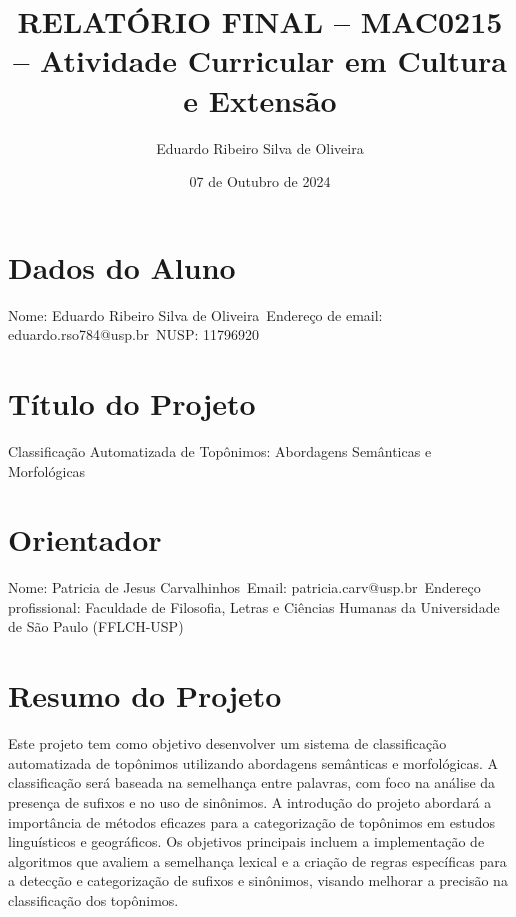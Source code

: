 \documentclass{article}
\title{RELATÓRIO FINAL – MAC0215 – Atividade Curricular em Cultura e Extensão}
\author{Eduardo Ribeiro Silva de Oliveira}
\date{07 de Outubro de 2024}
\begin{document}
\maketitle

\section*{Dados do Aluno}
Nome: Eduardo Ribeiro Silva de Oliveira\
Endereço de email: eduardo.rso784@usp.br\
NUSP: 11796920

\section*{Título do Projeto}
Classificação Automatizada de Topônimos: Abordagens Semânticas e Morfológicas

\section*{Orientador}
Nome: Patricia de Jesus Carvalhinhos\
Email: patricia.carv@usp.br\
Endereço profissional: Faculdade de Filosofia, Letras e Ciências Humanas da Universidade de São Paulo (FFLCH-USP)

\section*{Resumo do Projeto}
Este projeto tem como objetivo desenvolver um sistema de classificação automatizada de topônimos utilizando abordagens semânticas e morfológicas. A classificação será baseada na semelhança entre palavras, com foco na análise da presença de sufixos e no uso de sinônimos. A introdução do projeto abordará a importância de métodos eficazes para a categorização de topônimos em estudos linguísticos e geográficos. Os objetivos principais incluem a implementação de algoritmos que avaliem a semelhança lexical e a criação de regras específicas para a detecção e categorização de sufixos e sinônimos, visando melhorar a precisão na classificação dos topônimos.
\end{document}
